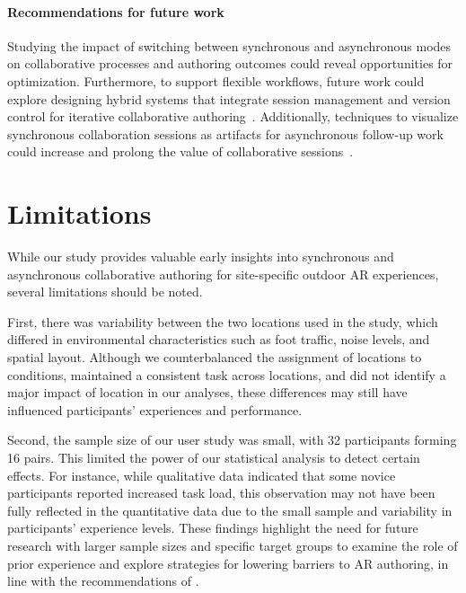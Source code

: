 \paragraph{\textbf{Recommendations for future work}}
Studying the impact of switching between synchronous and asynchronous modes on collaborative processes and authoring outcomes could reveal opportunities for optimization. Furthermore, to support flexible workflows, future work could explore designing hybrid systems that integrate session management and version control for iterative collaborative authoring~\cite{zhangVRGitVersionControl2023,xiaSpacetimeEnablingFluid2018}. Additionally, techniques to visualize synchronous collaboration sessions as artifacts for asynchronous follow-up work could increase and prolong the value of collaborative sessions~\cite{irlittiChallengesAsynchronousCollaboration2016,wangAgainTogetherSocially2020,choRealityReplayDetectingReplaying2023,wangMeetingBridgesDesigning2024}.

\section{Limitations}\label{sec:discussion:limitations}
While our study provides valuable early insights into synchronous and asynchronous collaborative authoring for site-specific outdoor AR experiences, several limitations should be noted.

First, there was variability between the two locations used in the study, which differed in environmental characteristics such as foot traffic, noise levels, and spatial layout. Although we counterbalanced the assignment of locations to conditions, maintained a consistent task across locations, and did not identify a major impact of location in our analyses, these differences may still have influenced participants' experiences and performance.

Second, the sample size of our user study was small, with 32 participants forming 16 pairs. This limited the power of our statistical analysis to detect certain effects. For instance, while qualitative data indicated that some novice participants reported increased task load, this observation may not have been fully reflected in the quantitative data due to the small sample and variability in participants' experience levels. These findings highlight the need for future research with larger sample sizes and specific target groups to examine the role of prior experience and explore strategies for lowering barriers to AR authoring, in line with the recommendations of \citet{ashtariCreatingAugmentedVirtual2020}.

